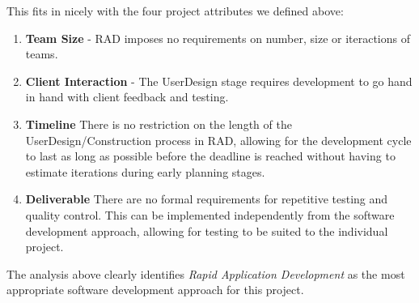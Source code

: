 \begin{itemize}
    This fits in nicely with the four project attributes we defined above:
    \begin{enumerate}
      \item \textbf{Team Size} - 
        RAD imposes no requirements on number, size or iteractions of teams.
      \item \textbf{Client Interaction} - 
        The UserDesign stage requires development to go hand in hand with client feedback and testing.
      \item \textbf{Timeline}
        There is no restriction on the length of the UserDesign/Construction process in RAD, allowing for the development cycle to last as long as possible before the deadline is reached without having to estimate iterations during early planning stages.
      \item \textbf{Deliverable}
        There are no formal requirements for repetitive testing and quality control. This can be implemented independently from the software development approach, allowing for testing to be suited to the individual project.
    \end{enumerate}
\end{itemize}
The analysis above clearly identifies \emph{Rapid Application Development} as the most appropriate software development approach for this project.